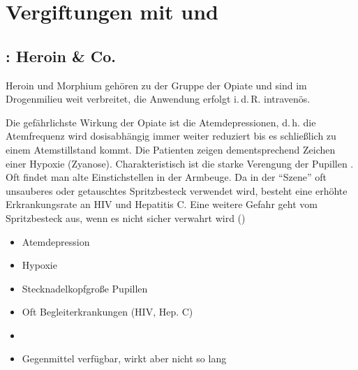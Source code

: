 
\section{Vergiftungen mit  und
}

\subsection{: Heroin \& Co.}

Heroin und Morphium gehören zu der Gruppe der Opiate und
sind im Drogenmilieu weit verbreitet, die Anwendung erfolgt
i.\,d.\,R. intravenös. 

{%
Die gefährlichste Wirkung der Opiate ist die
Atemdepressionen, d.\,h. die Atemfrequenz wird dosisabhängig
immer weiter reduziert bis es schließlich zu einem
Atemstillstand kommt. Die Patienten zeigen
dementsprechend Zeichen einer Hypoxie
(Zyanose). Charakteristisch ist die starke Verengung der
Pupillen . Oft
findet man alte Einstichstellen in der Armbeuge. Da in der
\enquote{Szene} oft unsauberes oder getauschtes Spritzbesteck
verwendet wird, besteht eine erhöhte Erkrankungsrate an HIV
und Hepatitis C. Eine weitere Gefahr geht vom Spritzbesteck
aus, wenn es nicht sicher verwahrt wird ()
}{
\begin{itemize}
    \item Atemdepression
    \item Hypoxie
    \item Stecknadelkopfgroße Pupillen
    \item Oft Begleiterkrankungen (HIV, Hep. C) 
    \item {}
    \item Gegenmittel verfügbar, wirkt aber nicht so lang
\end{itemize}
}{}{}{}

